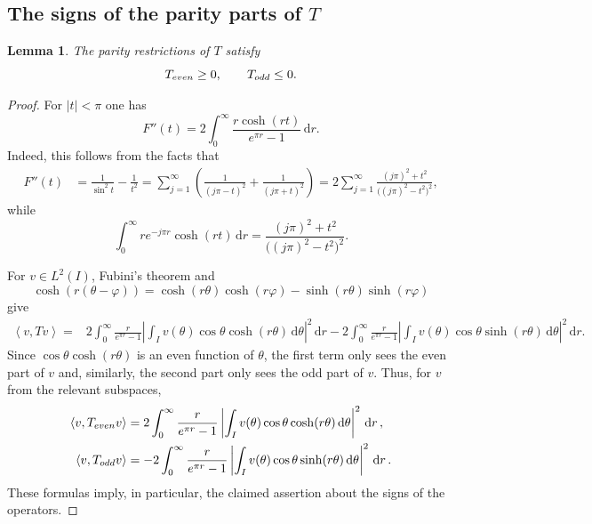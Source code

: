 \documentclass[10pt,a4paper]{amsart}
\newtheorem{lemma}[theorem]{Lemma}
\newcommand{\ip}[2]{\left\langle #1,#2\right\rangle}
\newcommand{\dd}{\,\mathrm{d}}
\begin{document}

\subsection*{The signs of the parity parts of $T$}

\begin{lemma}\label{lem:T-parity}
The parity restrictions of $T$ satisfy
\[
T_{\rm even}\geq0,
\qquad
T_{\rm odd}\leq0.
\]
\end{lemma}

\begin{proof}
For $|t|<\pi$ one has
\begin{equation}\label{eq:fdoubleprimerepr}
F''(t)=2\int_0^\infty
\frac{r\cosh(rt)}{e^{\pi r}-1}\dd r.
\end{equation}
Indeed, this follows from the facts that
\begin{align*}
F''(t)
&=\frac1{\sin^2t}-\frac1{t^2}
=\sum_{j=1}^\infty
\left(\frac1{(j\pi-t)^2}+\frac1{(j\pi+t)^2}\right)
=2\sum_{j=1}^\infty
\frac{(j\pi)^2+t^2}{\bigl((j\pi)^2-t^2\bigr)^2},
\end{align*}
while
\[
\int_0^\infty re^{-j\pi r}\cosh(rt)\dd r
=\frac{(j\pi)^2+t^2}{\bigl((j\pi)^2-t^2\bigr)^2}.
\]

For $v\in L^2(I)$, Fubini's theorem and
\[
\cosh(r(\theta-\varphi))
=\cosh(r\theta)\cosh(r\varphi)
-\sinh(r\theta)\sinh(r\varphi)
\]
give
\begin{align*}
\ip{v}{Tv}
={}&2\int_0^\infty\frac{r}{e^{\pi r}-1}
\left|\int_Iv(\theta)\cos\theta\cosh(r\theta)\dd\theta\right|^2\dd r
-2\int_0^\infty\frac{r}{e^{\pi r}-1}
\left|\int_Iv(\theta)\cos\theta\sinh(r\theta)\dd\theta\right|^2\dd r.
\end{align*}
Since $\cos\theta \cosh(r\theta)$ is an even function of $\theta$, the first term only sees the even part of $v$ and, similarly, the second part only sees the odd part of $v$. Thus, for $v$ from the relevant subspaces,
    \begin{align*}
        \ip{v}{T_{\rm even} v} & = 2 \int_0^\infty \frac{r}{e^{\pi r}-1} \left| \int_I v(\theta) \cos\theta \cosh(r\theta) \dd\theta\right|^2 \dd r \,,\\
        \ip{v}{T_{\rm odd} v} & = - 2 \int_0^\infty \frac{r}{e^{\pi r}-1} \left| \int_I v(\theta) \cos\theta \sinh(r\theta) \dd\theta\right|^2 \dd r \,.
    \end{align*}
    These formulas imply, in particular, the claimed assertion about the signs of the operators. 
\end{proof}
\end{document}
